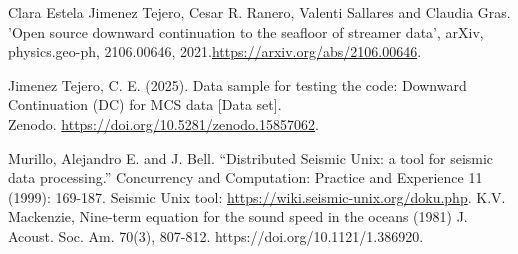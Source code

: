 \documentclass[11pt, oneside]{article}   	%
\begin{document}
\begin{thebibliography}{999}

 Clara Estela Jimenez Tejero, Cesar R. Ranero, Valenti Sallares and Claudia Gras. 'Open source downward continuation to the seafloor of streamer data', arXiv, physics.geo-ph, 2106.00646, 2021.\url{https://arxiv.org/abs/2106.00646}.

 Jimenez Tejero, C. E. (2025). Data sample for testing the code: Downward Continuation (DC) for MCS data [Data set]. \\
Zenodo. \url{https://doi.org/10.5281/zenodo.15857062}.

Murillo, Alejandro E. and J. Bell. “Distributed Seismic Unix: a tool for seismic data processing.” Concurrency and Computation: Practice and Experience 11 (1999): 169-187. Seismic Unix tool: \url{https://wiki.seismic-unix.org/doku.php}.
K.V. Mackenzie, Nine-term equation for the sound speed in the oceans (1981) J. Acoust. Soc. Am. 70(3), 807-812. https://doi.org/10.1121/1.386920.
\end{thebibliography}
\end{document}
